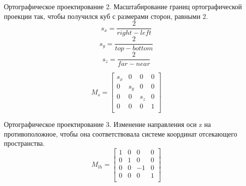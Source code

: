 \documentclass{beamer}
\begin{document}
	\begin{frame}{Ортографическое проектирование}
		2. Масштабирование границ ортографической проекции так, чтобы получился куб с размерами сторон, равными 2.
		\[
			s_x = \frac{2}{right - left}
		\]
		\[
			s_y = \frac{2}{top - bottom}
		\]
		\[
			s_z =  \frac{2}{far - near}
		\]

		\[
			M_s = 
			\begin{bmatrix}
				s_x & 0 & 0 & 0 \\
				0 & s_y & 0 & 0 \\
				0 & 0 & s_z & 0 \\
				0 & 0 & 0 & 1 \\
			\end{bmatrix}	
		\]
	\end{frame}	

	\begin{frame}{Ортографическое проектирование}
		3. Изменение направления оси z на противоположное, чтобы она соответствовала системе координат отсекающего пространства.
		\[
			M_{lh} = 
			\begin{bmatrix}
				1 & 0 & 0 & 0 \\
				0 & 1 & 0 & 0 \\
				0 & 0 & -1 & 0 \\
				0 & 0 & 0 & 1 \\
			\end{bmatrix}	
			\]
			
	\end{frame}
\end{document}
